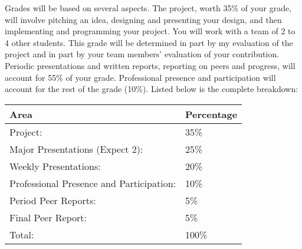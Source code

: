 Grades will be based on several aspects. The project, worth 35\% of your grade, will involve pitching an idea, designing and presenting your design, and then implementing and programming your project. You will work with a team of 2 to 4 other students. This grade will be determined in part by my evaluation of the project and in part by your team members' evaluation of your contribution. Periodic presentations and written reports, reporting on peers and progress, will account for 55\% of your grade. Professional presence and participation will account for the rest of the grade (10\%).
Listed below is the complete breakdown:
\par\vspace{1cm}
\begin{tabular}{ @{}ll@{} }
    \toprule
        Area & Percentage \\
    \midrule
        Project: & 35\% \\
        Major Presentations (Expect 2): & 25\% \\
        Weekly Presentations: & 20\% \\
        Professional Presence and Participation: & 10\% \\
        Period Peer Reports: & 5\% \\
        Final Peer Report: & 5\% \\
        Total: & 100\% \\
    \bottomrule
\end{tabular}